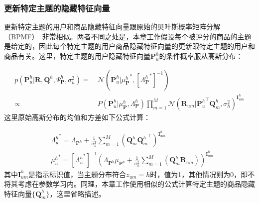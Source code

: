 \subsubsection{更新特定主题的隐藏特征向量}
更新特定主题的用户和商品隐藏特征向量跟原始的贝叶斯概率矩阵分解（BPMF）~\cite{salakhutdinov2008bayesian}非常相似。两者不同之处是，本章工作假设每个被评分的商品的主题是给定的，因此每个特定主题的用户商品隐藏特征向量的更新跟特定主题的用户和商品有关。这里，特定主题的用户隐藏特征向量$\mathbf{P}_u^{h}$的条件概率服从高斯分布：

\begin{align}
\label{eq-bpmtmf-usersGaussian}
p(\mathbf{P}_u^{h}|\mathbf{R},\mathbf{Q}^{h},\Psi_{\mathbf{P}}^{h},\sigma_h^2) =&\ \mathcal{N}(\mathbf{P}_u^{h}|{\mu_{\mathbf{P}}^{h}}^*,[{\Lambda_{\mathbf{P}}^{h}}^*]^{-1}) \\\nonumber
\propto&\ P(\mathbf{P}_u^{h}|\mu_{\mathbf{P}}^{h},\Lambda_{\mathbf{P}}^{h})\prod_{m=1 }^M\mathcal{N}(\mathbf{R}_{um}|{\mathbf{P}_u^{h}}^{\top} \mathbf{Q}_m^{h},\sigma_h^2)^{\mathbf{I}^{h}_{um}}\nonumber
\end{align}
这里原始高斯分布的均值和方差如下公式计算：

\begin{align}
&{\Lambda_u^{h}}^\ast =\Lambda_{\mathbf{P}^{h}}+\frac{1}{\sigma_h^2}\sum_{m=1}^M(\mathbf{Q}_m^{h}{\mathbf{Q}_m^{h}}^{\top})^{\mathbf{I}^{h}_{um}} \label{eq-bpmtmf-var}\\
&{\mu_u^{h}}^\ast = [{\Lambda_u^{h}}^*]^{-1}(\Lambda_{\mathbf{P}^{h}}\mu_{\mathbf{P}^{h}}+\frac{1}{\sigma_h^2}\sum_{m=1}^M(\mathbf{Q}_m^{h} \mathbf{R}_{um}))^{\mathbf{I}^{h}_{um}}\label{eq-bpmtmf-mean}
\end{align}
其中$\mathbf{I}^{h}_{um}$是指示标识值，当主题分布符合$z_{um}=h$时，值为1，其他情况则为0，即不将其考虑在参数学习内。同理，本章工作使用相似的公式计算特定主题的商品隐藏特征向量$\{\mathbf{Q}_m^{h}\}$，这里省略描述。

